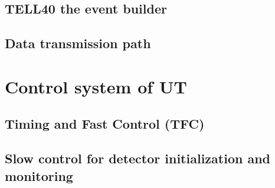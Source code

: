 \subsection{TELL40 the event builder}


\subsection{Data transmission path}


\section{Control system of UT}
\label{ref:ut:ctrl}


\subsection{Timing and Fast Control (TFC)}


\subsection{Slow control for detector initialization and monitoring}
